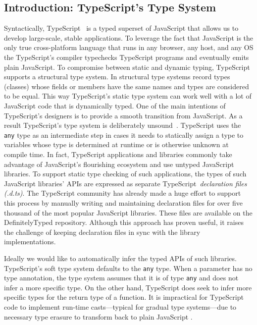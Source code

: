 \documentclass[sigplan,10pt,anonymous]{acmart} %
\newcommand{\margincomment}[2]{\marginpar{\scriptsize\color{Maroon}#1 says: #2}}
\newcommand{\adg}[1]{\margincomment{ADG}{#1}}
\theoremstyle{plain}
\theoremstyle{remark}
\theoremstyle{definition}
\begin{document}
\subsection{Introduction: TypeScript's Type System}\label{ssec:intro-typescript}
Syntactically, TypeScript~\citep{typescript} is a typed superset of
JavaScript that allows us to develop large-scale, stable applications.
To leverage the fact that JavaScript is the only true cross-platform
language that runs in any browser, any host, and any OS the TypeScript's
compiler typechecks TypeScript programs and eventually emits plain JavaScript.
To compromise between static and dynamic typing, TypeScript supports a
structural type system.
In structural type systems record types (classes) whose fields or members have the same names and types are considered to be equal.
This way TypeScript's static type system can work well with a lot of JavaScript code that is dynamically typed.
One of the main intentions of TypeScript's designers is to
provide a smooth transition from JavaScript.
%
As a result TypeScript's type system is deliberately unsound~\citep{understandtypescript}.
TypeScript uses the \texttt{any} type as an intermediate
step in cases it needs to statically assign a type to variables
whose type is determined at runtime or is otherwise unknown at compile time.
%
In fact, TypeScript applications and libraries commonly take advantage of JavaScript's flourishing ecosystem
and use untyped JavaScript libraries.
To support static type checking of such applications,
the types of such JavaScript libraries' APIs are expressed
as separate TypeScript~\emph{declaration files} \textit{(.d.ts)}.
The TypeScript community has already
made a huge effort to support this process by manually writing and maintaining
declaration files for over five thousand of the most popular JavaScript
libraries. These files are available on the DefinitelyTyped
\citep{definitelytyped} repository. Although this approach has proven
useful, it raises the challenge of keeping declaration files
in sync with the library implementations.

Ideally we would like to automatically infer the typed APIs of such
libraries.
TypeScript's soft type system \citep{softtyping}
defaults to the \texttt{any} type.
When a parameter has no type annotation, the type system assumes that it is of type
\texttt{any} and does not infer a more specific type.
%
On the other hand, TypeScript does seek to infer more specific types for the return type of a function.
%
It is impractical for TypeScript code to implement run-time casts---typical for gradual type
systems---due to necessary type erasure to transform back to plain JavaScript \citep{understandtypescript}.
\end{document}
